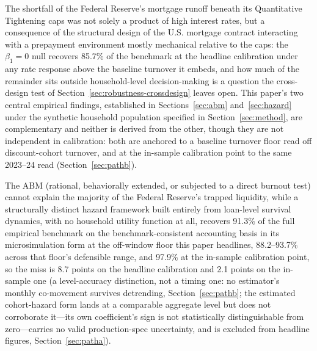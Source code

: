 \documentclass[12pt]{article}
\begin{document}
The shortfall of the Federal Reserve's mortgage runoff beneath its Quantitative Tightening caps was not solely a product of high interest rates, but a consequence of the structural design of the U.S. mortgage contract interacting with a prepayment environment mostly mechanical relative to the caps: the $\beta_1 = 0$ null recovers 85.7\% of the benchmark at the headline calibration under any rate response above the baseline turnover it embeds, and how much of the remainder sits outside household-level decision-making is a question the cross-design test of Section~\ref{sec:robustness-crossdesign} leaves open. This paper's two central empirical findings, established in Sections~\ref{sec:abm} and~\ref{sec:hazard} under the synthetic household population specified in Section~\ref{sec:method}, are complementary and neither is derived from the other, though they are not independent in calibration: both are anchored to a baseline turnover floor read off discount-cohort turnover, and at the in-sample calibration point to the same 2023--24 read (Section~\ref{sec:pathb}).

The ABM (rational, behaviorally extended, or subjected to a direct burnout test) cannot explain the majority of the Federal Reserve's trapped liquidity, while a structurally distinct hazard framework built entirely from loan-level survival dynamics, with no household utility function at all, recovers 91.3\% of the full empirical benchmark on the benchmark-consistent accounting basis in its microsimulation form at the off-window floor this paper headlines, 88.2--93.7\% across that floor's defensible range, and 97.9\% at the in-sample calibration point, so the miss is 8.7 points on the headline calibration and 2.1 points on the in-sample one (a level-accuracy distinction, not a timing one: no estimator's monthly co-movement survives detrending, Section~\ref{sec:pathb}; the estimated cohort-hazard form lands at a comparable aggregate level but does not corroborate it---its own coefficient's sign is not statistically distinguishable from zero---carries no valid production-spec uncertainty, and is excluded from headline figures, Section~\ref{sec:patha}).
\end{document}
